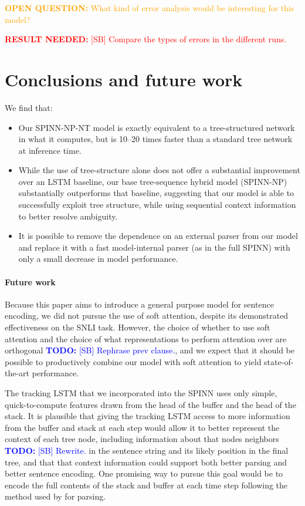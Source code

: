 \documentclass[11pt]{article}
\newcommand\todo[1]{\textcolor{blue}{\textbf{TODO:} #1}}
\newcommand\result[1]{\textcolor{red}{\textbf{RESULT NEEDED:} #1}}
\newcommand\question[1]{\textcolor{orange}{\textbf{OPEN QUESTION:} #1}}
\begin{document}
\question{What kind of error analysis would be interesting for this model?}

\result{[SB] Compare the types of errors in the different runs.}

\vspace{10em}

\section{Conclusions and future work}

We find that:
\begin{itemize}
\item Our SPINN-NP-NT model is exactly equivalent to a tree-structured network in what it computes, but is 10--20 times faster than a standard tree network at inference time.
\item While the use of tree-structure alone does not offer a substantial improvement over an LSTM baseline, our base tree-sequence hybrid model (SPINN-NP) substantially outperforms that baseline, suggesting that our model is able to successfully exploit tree structure, while using sequential context information to better resolve ambiguity.
\item It is possible to remove the dependence on an external parser from our model and replace it with a fast model-internal parser (as in the full SPINN) with only a small decrease in model performance.
\end{itemize}

\paragraph{Future work} Because this paper aims to introduce a general purpose model for sentence encoding, we did not pursue the use of soft attention, despite its demonstrated effectiveness on the SNLI task. However, the choice of whether to use soft attention and the choice of what representations to perform attention over are orthogonal \todo{[SB] Rephrase prev clause.}, and we expect that it should be possible to productively combine our model with soft attention to yield state-of-the-art performance.

The tracking LSTM that we incorporated into the SPINN uses only simple, quick-to-compute features drawn from the head of the buffer and the head of the stack. It is plausible that giving the tracking LSTM access to more information from the buffer and stack at each step would allow it to better represent the context of each tree node, including information about that nodes neighbors \todo{[SB] Rewrite.} in the sentence string and its likely position in the final tree, and that that context information could support both better parsing and better sentence encoding. One promising way to pursue this goal would be to encode the full contents of the stack and buffer at each time step following the method used by \citet{dyer-EtAl:2015:ACL-IJCNLP} for parsing.
\end{document}
